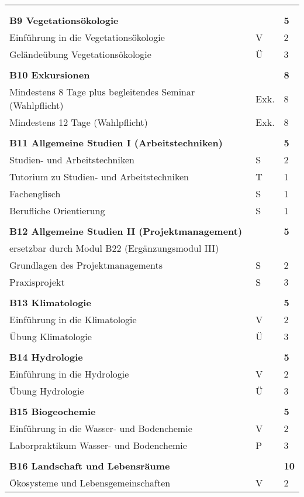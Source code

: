 \begin{longtable}{p{} p{} p{}}
&&\\
&&\\
\textbf{B9 Vegetationsökologie} & & \textbf{5}\\
Einführung in die Vegetationsökologie & V & 2 \\
Geländeübung Vegetationsökologie & Ü & 3\\
&&\\
\textbf{B10 Exkursionen}&&\textbf{8}\\
Mindestens 8 Tage plus begleitendes Seminar (Wahlpflicht) & Exk. & 8\\
Mindestens 12 Tage (Wahlpflicht) & Exk. & 8\\
&&\\
\textbf{B11 Allgemeine Studien I (Arbeitstechniken)}& & \textbf{5}\\
Studien- und Arbeitstechniken & S & 2\\
Tutorium zu Studien- und Arbeitstechniken & T & 1\\
Fachenglisch & S & 1\\
Berufliche Orientierung & S & 1\\
&&\\
\textbf{B12 Allgemeine Studien II (Projektmanagement)}&& \textbf{5}\\
ersetzbar durch Modul B22 (Ergänzungsmodul III)\\ 
Grundlagen des Projektmanagements & S & 2\\
Praxisprojekt & S & 3\\
&&\\
\textbf{B13 Klimatologie} && \textbf{5}\\
Einführung in die Klimatologie & V & 2\\
Übung Klimatologie & Ü & 3\\
&&\\
\textbf{B14 Hydrologie} && \textbf{5}\\
Einführung in die Hydrologie & V & 2\\
Übung Hydrologie &Ü&3\\
&&\\
\textbf{B15 Biogeochemie} && \textbf{5}\\
Einführung in die Wasser- und Bodenchemie & V & 2\\
Laborpraktikum Wasser- und Bodenchemie & P & 3\\
&&\\
\textbf{B16 Landschaft und Lebensräume} & & \textbf{10}\\
Ökosysteme und Lebensgemeinschaften & V & 2\\

\end{longtable}
